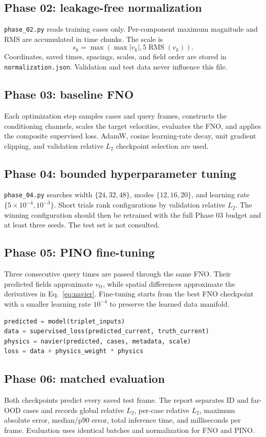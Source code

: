 \documentclass[11pt]{article}
\begin{document}
\subsection{Phase 02: leakage-free normalization}
\texttt{phase\_02.py} reads training cases only.  Per-component maximum magnitude and
RMS are accumulated in time chunks.  The scale is
\[s_k=\max(\max|v_k|,5\operatorname{RMS}(v_k)).\]
Coordinates, saved times, spacings, scales, and field order are stored in
\texttt{normalization.json}.  Validation and test data never influence this file.

\subsection{Phase 03: baseline FNO}
Each optimization step samples cases and query frames, constructs the conditioning
channels, scales the target velocities, evaluates the FNO, and applies the composite
supervised loss.  AdamW, cosine learning-rate decay, unit gradient clipping, and
validation relative $L_2$ checkpoint selection are used.

\subsection{Phase 04: bounded hyperparameter tuning}
\texttt{phase\_04.py} searches width $\{24,32,48\}$, modes $\{12,16,20\}$, and
learning rate $\{5\times10^{-4},10^{-3}\}$.  Short trials rank configurations by
validation relative $L_2$.  The winning configuration should then be retrained with
the full Phase 03 budget and at least three seeds.  The test set is not consulted.

\subsection{Phase 05: PINO fine-tuning}
Three consecutive query times are passed through the same FNO.  Their predicted
fields approximate $v_{tt}$, while spatial differences approximate the derivatives
in Eq.~\eqref{eq:navier}.  Fine-tuning starts from the best FNO checkpoint with a
smaller learning rate $10^{-4}$ to preserve the learned data manifold.
\begin{lstlisting}[language=Python]
predicted = model(triplet_inputs)
data = supervised_loss(predicted_current, truth_current)
physics = navier(predicted, cases, metadata, scale)
loss = data + physics_weight * physics
\end{lstlisting}

\subsection{Phase 06: matched evaluation}
Both checkpoints predict every saved test frame.  The report separates ID and
far-OOD cases and records global relative $L_2$, per-case relative $L_2$, maximum
absolute error, median/p90 error, total inference time, and milliseconds per frame.
Evaluation uses identical batches and normalization for FNO and PINO.
\end{document}
